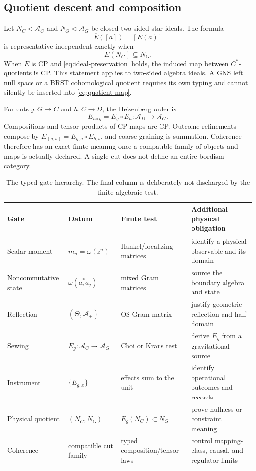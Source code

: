 \documentclass[11pt,a4paper]{article}
\theoremstyle{definition}
\theoremstyle{remark}
\newcommand{\A}{\mathcal A}
\begin{document}
\subsection{Quotient descent and composition}

Let $N_C\triangleleft\A_C$ and $N_G\triangleleft\A_G$ be closed two-sided star
ideals.  The formula
\begin{equation}
  \overline E([a])=[E(a)]
  \label{eq:quotient-map}
\end{equation}
is representative independent exactly when
\begin{equation}
  E(N_C)\subseteq N_G.
  \label{eq:ideal-preservation}
\end{equation}
When $E$ is CP and \eqref{eq:ideal-preservation} holds, the induced map between
$C^*$-quotients is CP.  This statement applies to two-sided algebra ideals.  A GNS left
null space or a BRST cohomological quotient requires its own typing and cannot silently
be inserted into \eqref{eq:quotient-map}.

For cuts $g:G\to C$ and $h:C\to D$, the Heisenberg order is
\begin{equation}
  E_{h\circ g}=E_g\circ E_h:\A_D\longrightarrow\A_G.
  \label{eq:composition-order}
\end{equation}
Compositions and tensor products of CP maps are CP.  Outcome refinements compose by
$E_{(q,s)}=E_{g,q}\circ E_{h,s}$, and coarse graining is summation.  Coherence therefore
has an exact finite meaning once a compatible family of objects and maps is actually
declared.  A single cut does not define an entire bordism category.

\begin{table}[t]
\centering
\small
\caption{The typed gate hierarchy.  The final column is deliberately not discharged by
the finite algebraic test.}
\label{tab:gates}
\begin{tabularx}{\textwidth}{@{}p{}p{}p{}X@{}}
\toprule
Gate & Datum & Finite test & Additional physical obligation\\
\midrule
Scalar moment & $m_n=\omega(z^n)$ & Hankel/localizing matrices & identify a physical observable and its domain\\
Noncommutative state & $\omega(a_i^*a_j)$ & mixed Gram matrices & source the boundary algebra and state\\
Reflection & $(\Theta,\A_+)$ & OS Gram matrix & justify geometric reflection and half-domain\\
Sewing & $E_g:\A_C\to\A_G$ & Choi or Kraus test & derive $E_g$ from a gravitational source\\
Instrument & $\{E_{g,x}\}$ & effects sum to the unit & identify operational outcomes and records\\
Physical quotient & $(N_C,N_G)$ & $E_g(N_C)\subset N_G$ & prove nullness or constraint meaning\\
Coherence & compatible cut family & typed composition/tensor laws & control mapping-class, causal, and regulator limits\\
\bottomrule
\end{tabularx}
\end{table}
\end{document}
